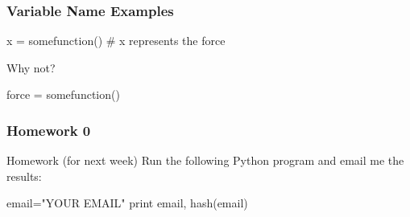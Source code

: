 \begin{frame}[fragile]
\frametitle{Variable Name Examples}
\begin{python}
x = somefunction() # x represents the force
\end{python}

Why not?

\begin{python}
force = somefunction()
\end{python}

\end{frame}

\begin{frame}[fragile]
\frametitle{Homework 0}

\begin{block}{Homework (for next week)}
Run the following Python program and email me the results:
\begin{python}
email="YOUR EMAIL"
print email, hash(email)
\end{python}
\end{block}
\end{frame}


